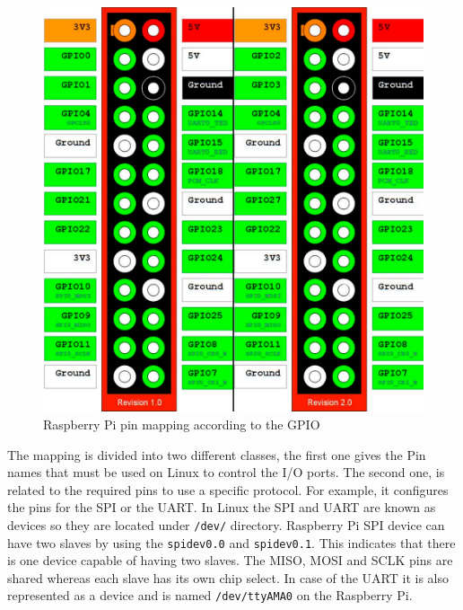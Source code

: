 \begin{figure}[H]\begin{center}
 \centering
  \captionsetup{justification=centering}
  \includegraphics[scale=0.30]{pictures/iosharp/mapping-raspberrypi}
  \caption{Raspberry Pi pin mapping according to the GPIO\label{fig:mapping-rpi}}
\end{center}\end{figure}
The mapping is divided into two different classes, the first one gives the Pin names that must be used on Linux to control the I/O ports. The second one, is related to the required pins to use a specific protocol. For example, it configures the pins for the SPI or the UART. In Linux the SPI and UART are known as devices so they are located under \verb!/dev/! directory. Raspberry Pi SPI device can have two slaves by using the \verb!spidev0.0! and \verb!spidev0.1!. This indicates that there is one device capable of having two slaves. The MISO, MOSI and SCLK pins are shared whereas each slave has its own chip select. In case of the UART it is also represented as a device and is named \verb!/dev/ttyAMA0! on the Raspberry Pi.